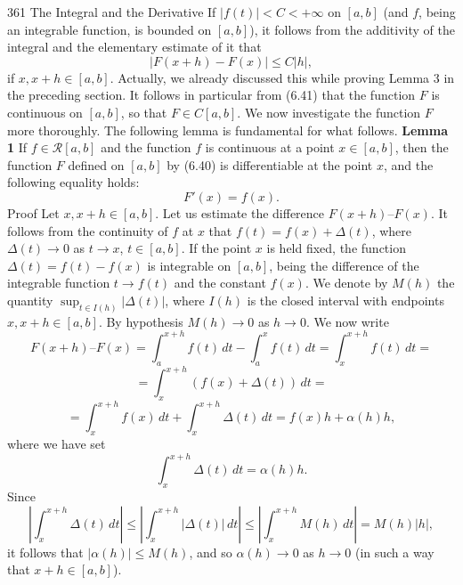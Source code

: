 361
 The Integral and the Derivative
\medskip
If $|f(t)| < C < +\infty$ on $[a, b]$ (and $f$, being an integrable function, is bounded
on $[a, b]$), it follows from the additivity of the integral and the elementary estimate
of it that
\[
|F(x+h) - F(x)| \le C|h|,
\tag{6.41}
\]
if $x, x + h \in [a, b]$.
\medskip
Actually, we already discussed this while proving Lemma 3 in the preceding
section.
\medskip
It follows in particular from (6.41) that the function $F$ is continuous on $[a, b]$, so
that $F \in C[a, b]$.
\medskip
We now investigate the function $F$ more thoroughly.
\medskip
The following lemma is fundamental for what follows.
\medskip
\noindent \textbf{Lemma 1} If $f \in \mathcal{R}[a,b]$ and the function $f$ is continuous at a point $x \in [a, b]$,
then the function $F$ defined on $[a, b]$ by (6.40) is differentiable at the point $x$, and
the following equality holds:
\[
F'(x) = f(x).
\]
\medskip
Proof Let $x, x + h \in [a, b]$. Let us estimate the difference $F(x + h) – F(x)$. It
follows from the continuity of $f$ at $x$ that $f(t) = f(x) + \Delta(t)$, where $\Delta(t) \to 0$
as $t \to x$, $t \in [a, b]$. If the point $x$ is held fixed, the function $\Delta(t) = f(t) - f(x)$
is integrable on $[a, b]$, being the difference of the integrable function $t \to f(t)$ and
the constant $f(x)$. We denote by $M(h)$ the quantity $\sup_{t\in I(h)} |\Delta(t)|$, where $I(h)$ is
the closed interval with endpoints $x, x + h \in [a, b]$. By hypothesis $M(h) \to 0$ as
$h\to 0$.
\medskip
We now write
\[
F(x + h) – F(x) = \int_a^{x+h} f(t)\,dt - \int_a^x f(t)\,dt = \int_x^{x+h} f(t)\,dt =
\]
\[
= \int_x^{x+h} (f(x) + \Delta(t))\,dt =
\]
\[
= \int_x^{x+h} f(x)\,dt + \int_x^{x+h} \Delta(t)\,dt = f(x)h + \alpha(h)h,
\]
where we have set
\[
\int_x^{x+h} \Delta(t)\,dt = \alpha(h)h.
\]
\medskip
Since
\[
\left|\int_x^{x+h} \Delta(t)\,dt\right| \le \left|\int_x^{x+h} |\Delta(t)|\,dt\right| \le \left|\int_x^{x+h} M(h)\,dt\right| = M(h)|h|,
\]
it follows that $|\alpha(h)| \le M(h)$, and so $\alpha (h) \to 0$ as $h \to 0$ (in such a way that $x + h \in
[a, b]$).
